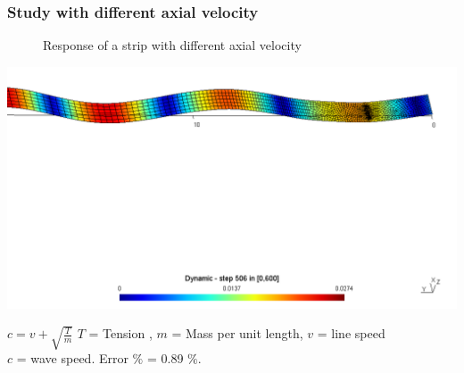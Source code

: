 \documentclass[9pt]{beamer}
\begin{document}
\begin{frame}
\frametitle{Study with different axial velocity}


\begin{figure}
\subfloat{}
\caption{Response of a strip with different axial velocity}
\end{figure}





\href{run:images/movie1.mpg}{\includegraphics[width=1.0\textwidth,trim={0cm 15cm 0cm 1cm},clip]{ParaStudy_onlydata/dir.png}}

$c=v+\sqrt{\frac {T} {m}}$   $T$ = Tension , $m$ = Mass per unit length, $v$ = line speed \\ $c$ = wave speed. Error $\%$ = 0.89 $\%$. 



\end{frame}
\end{document}
